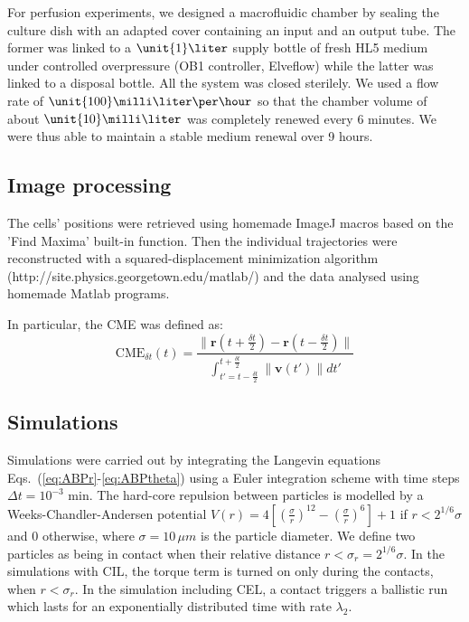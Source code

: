 \documentclass[11pt, twocolumn]{article}
\newcommand\rev[1]{{#1}}
\begin{document}
{For perfusion experiments, we designed a macrofluidic chamber by
sealing the culture dish with an adapted cover containing an input and
an output tube. The former was linked to a $\unit{1}\liter$ supply
bottle of fresh HL5 medium under controlled overpressure (OB1
controller, Elveflow) while the latter was linked to a disposal
bottle. All the system was closed sterilely. We used a flow rate of
$\unit{100}\milli\liter\per\hour$ so that the chamber volume of about
$\unit{10}\milli\liter$ was completely renewed every 6 minutes. We
were thus able to maintain a stable medium renewal over 9 hours.

\subsection*{Image processing}
The cells' positions were retrieved using homemade ImageJ macros based
on the 'Find Maxima' built-in function. Then the individual
trajectories were reconstructed with a squared-displacement
minimization algorithm (http://site.physics.georgetown.edu/matlab/)
and the data analysed using homemade Matlab programs.

In particular, the CME was defined as:
\begin{equation}
\text{CME}_{\delta t}(t) = \frac{\|\mathbf{r}(t+\frac{\delta t}{2})-\mathbf{r}(t-\frac{\delta t}{2})\|}{\int_{t'=t-\frac{\delta t}{2}}^{t+\frac{\delta t}{2}}\|\mathbf{v}(t')\|dt'}
\label{CME}
\end{equation}

\subsection*{Simulations}
Simulations were carried out by integrating the Langevin equations
Eqs.~(\ref{eq:ABPr}-\ref{eq:ABPtheta}) using a Euler integration
scheme with time steps $\Delta t=10^{-3}$ min. The hard-core repulsion
between particles is modelled by a Weeks-Chandler-Andersen potential
$V(r)=4\left[ \left(\frac \sigma r \right)^{12}-\left(\frac \sigma r
  \right)^{6}\right]+1$
if $r<2^{1/6}\sigma$ and $0$ otherwise, where $\sigma=10\,\mu m$ is
the particle diameter. We define two particles as being in contact
when their relative distance $r<\sigma_r=2^{1/6}\sigma$.  \rev{ In the
  simulations with CIL, the torque term is turned on only during the
  contacts, when $r<\sigma_r$.} In the simulation including CEL, a
contact triggers a ballistic run which lasts for an exponentially
distributed time with rate $\lambda_2$.}
\end{document}
